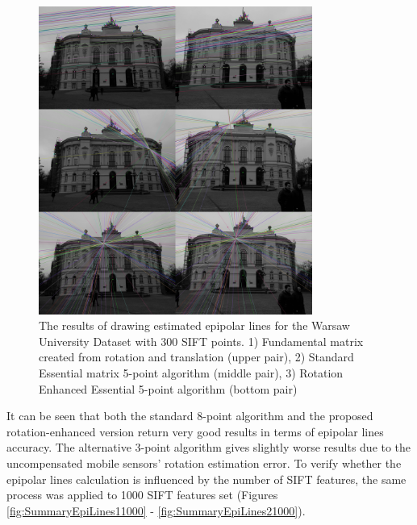 \begin{figure}[ht!]
    \centering
    \includegraphics[width=0.8\textwidth]{summary2Sift300}
    \caption[The results of drawing estimated epipolar lines for the Warsaw University Dataset with 300 SIFT points (2nd group)]{The results of drawing estimated epipolar lines for the Warsaw University Dataset with 300 SIFT points. 1) Fundamental matrix created from rotation and translation (upper pair), 2) Standard Essential matrix 5-point algorithm (middle pair), 3) Rotation Enhanced Essential 5-point algorithm (bottom pair) }
    \label{fig:SummaryEpiLines2300}
\end{figure}
It can be seen that both the standard 8-point algorithm and the proposed rotation-enhanced version return very good results in terms of epipolar lines accuracy. The alternative 3-point algorithm gives slightly worse results due to the uncompensated mobile sensors' rotation estimation error. \newline
To verify whether the epipolar lines calculation is influenced by the number of SIFT features, the same process was applied to 1000 SIFT features set (Figures \ref{fig:SummaryEpiLines11000} - \ref{fig:SummaryEpiLines21000}). 

